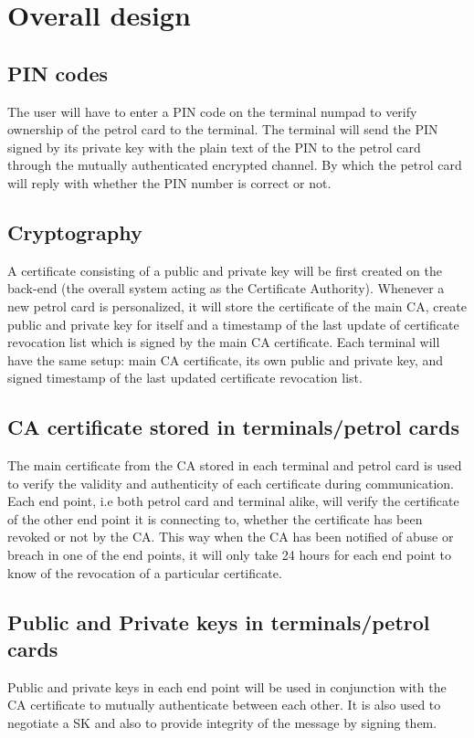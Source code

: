 \section{Overall design}
\subsection{PIN codes}
The user will have to enter a PIN code on the terminal numpad to verify ownership of the petrol card to the terminal. The terminal will send the PIN signed by its private key with the plain text of the PIN to the petrol card through the mutually authenticated encrypted channel. By which the petrol card will reply with whether the PIN number is correct or not.

\subsection{Cryptography}
A certificate consisting of a public and private key will be first created on the back-end (the overall system acting as the Certificate Authority). Whenever a new petrol card is personalized, it will store the certificate of the main CA, create public and private key for itself and a timestamp of the last update of certificate revocation list which is signed by the main CA certificate. Each terminal will have the same setup: main CA certificate, its own public and private key, and signed timestamp of the last updated certificate revocation list.

\subsection{CA certificate stored in terminals/petrol cards}
The main certificate from the CA stored in each terminal and petrol card is used to verify the validity and authenticity of each certificate during communication. Each end point, i.e both petrol card and terminal alike, will verify the certificate of the other end point it is connecting to, whether the certificate has been revoked or not by the CA. This way when the CA has been notified of abuse or breach in one of the end points, it will only take 24 hours for each end point to know of the revocation of a particular certificate.

\subsection{Public and Private keys in terminals/petrol cards}
Public and private keys in each end point will be used in conjunction with the CA certificate to mutually authenticate between each other. It is also used to negotiate a SK and also to provide integrity of the message by signing them.


